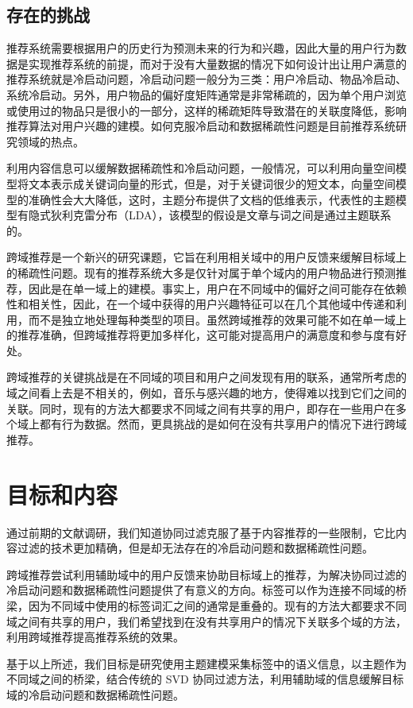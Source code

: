 \section{存在的挑战} 
推荐系统需要根据用户的历史行为预测未来的行为和兴趣，因此大量的用户行为数据是实现推荐系统的前提，而对于没有大量数据的情况下如何设计出让用户满意的推荐系统就是冷启动问题，冷启动问题一般分为三类：用户冷启动、物品冷启动、系统冷启动。另外，用户物品的偏好度矩阵通常是非常稀疏的，因为单个用户浏览或使用过的物品只是很小的一部分，这样的稀疏矩阵导致潜在的关联度降低，影响推荐算法对用户兴趣的建模。如何克服冷启动和数据稀疏性问题是目前推荐系统研究领域的热点。

利用内容信息可以缓解数据稀疏性和冷启动问题，一般情况，可以利用向量空间模型将文本表示成关键词向量的形式，但是，对于关键词很少的短文本，向量空间模型的准确性会大大降低，这时，主题分布提供了文档的低维表示，代表性的主题模型有隐式狄利克雷分布（LDA），该模型的假设是文章与词之间是通过主题联系的。

跨域推荐是一个新兴的研究课题，它旨在利用相关域中的用户反馈来缓解目标域上的稀疏性问题。现有的推荐系统大多是仅针对属于单个域内的用户物品进行预测推荐，因此是在单一域上的建模。事实上，用户在不同域中的偏好之间可能存在依赖性和相关性，因此，在一个域中获得的用户兴趣特征可以在几个其他域中传递和利用，而不是独立地处理每种类型的项目。虽然跨域推荐的效果可能不如在单一域上的推荐准确，但跨域推荐将更加多样化，这可能对提高用户的满意度和参与度有好处\cite{Fern2012Cross}。

跨域推荐的关键挑战是在不同域的项目和用户之间发现有用的联系，通常所考虑的域之间看上去是不相关的，例如，音乐与感兴趣的地方，使得难以找到它们之间的关联\cite{shi2011tags}。同时，现有的方法大都要求不同域之间有共享的用户，即存在一些用户在多个域上都有行为数据。然而，更具挑战的是如何在没有共享用户的情况下进行跨域推荐。


\chapter{目标和内容}
通过前期的文献调研，我们知道协同过滤克服了基于内容推荐的一些限制，它比内容过滤的技术更加精确，但是却无法存在的冷启动问题和数据稀疏性问题。

跨域推荐尝试利用辅助域中的用户反馈来协助目标域上的推荐，为解决协同过滤的冷启动问题和数据稀疏性问题提供了有意义的方向。标签可以作为连接不同域的桥梁，因为不同域中使用的标签词汇之间的通常是重叠的。现有的方法大都要求不同域之间有共享的用户，我们希望找到在没有共享用户的情况下关联多个域的方法，利用跨域推荐提高推荐系统的效果。

基于以上所述，我们目标是研究使用主题建模采集标签中的语义信息，以主题作为不同域之间的桥梁，结合传统的 SVD 协同过滤方法，利用辅助域的信息缓解目标域的冷启动问题和数据稀疏性问题。

